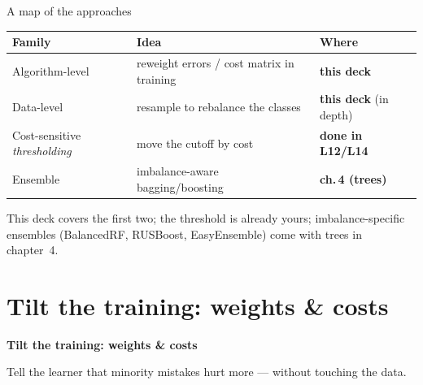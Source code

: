 \documentclass[aspectratio=169]{beamer}
\begin{document}
\begin{frame}{A map of the approaches}
  \begin{center}\small
    \renewcommand{\arraystretch}{1.3}
    \begin{tabular}{l l l}
      \textbf{Family} & \textbf{Idea} & \textbf{Where} \\
      \hline
      Algorithm-level & reweight errors / cost matrix in training & \textbf{this deck} \\
      Data-level & resample to rebalance the classes & \textbf{this deck} (in depth) \\
      Cost-sensitive \emph{thresholding} & move the cutoff by cost & \textbf{done in L12/L14} \\
      Ensemble & imbalance-aware bagging/boosting & \textbf{ch.\,4 (trees)} \\
      \hline
    \end{tabular}
  \end{center}
  \vfill
  \footnotesize This deck covers the first two; the threshold is already yours; imbalance-specific
  ensembles (BalancedRF, RUSBoost, EasyEnsemble) come with trees in chapter~4.
\end{frame}

\section{Tilt the training: weights \& costs}

\begin{frame}[plain]
  \vfill
  \begin{center}
    {\Large\color{popblue}\textbf{Tilt the training: weights \& costs}}\\[0.9em]
    \begin{minipage}{0.82\textwidth}\centering\small
      Tell the learner that minority mistakes hurt more --- without touching the data.
    \end{minipage}
  \end{center}
  \vfill
\end{frame}
\end{document}
